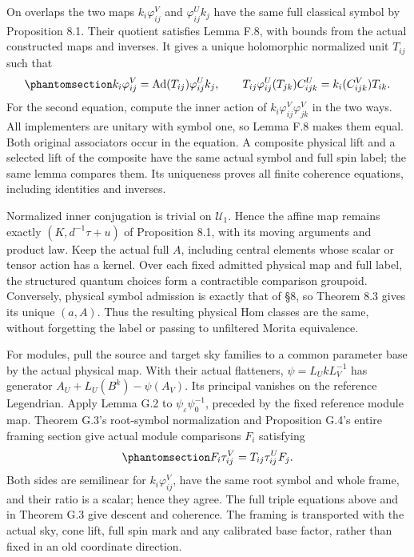 \documentclass[
  english,
  11pt,
  reqno]{amsart}
\begin{document}
On overlaps the two maps \(k_i\varphi^V_{ij}\) and \(\varphi^U_{ij}k_j\)
have the same full classical symbol by Proposition 8.1. Their quotient
satisfies Lemma F.8, with bounds from the actual constructed maps and
inverses. It gives a unique holomorphic normalized unit \(T_{ij}\) such
that
\begin{equation}\protect\phantomsection\label{eq:gg-op-physical-descent}{
 k_i\varphi^V_{ij}
       =\operatorname{Ad}(T_{ij})\varphi^U_{ij}k_j,\qquad
 T_{ij}\varphi^U_{ij}(T_{jk})C^U_{ijk}
       =k_i(C^V_{ijk})T_{ik}.
}\end{equation} For the second equation, compute the inner action of
\(k_i\varphi^V_{ij}\varphi^V_{jk}\) in the two ways. All implementers
are unitary with symbol one, so Lemma F.8 makes them equal. Both
original associators occur in the equation. A composite physical lift
and a selected lift of the composite have the same actual symbol and
full spin label; the same lemma compares them. Its uniqueness proves all
finite coherence equations, including identities and inverses.

Normalized inner conjugation is trivial on \(\mathscr U_1\). Hence the
affine map remains exactly \((K,d^{-1}\tau+u)\) of Proposition 8.1, with
its moving arguments and product law. Keep the actual full \(A\),
including central elements whose scalar or tensor action has a kernel.
Over each fixed admitted physical map and full label, the structured
quantum choices form a contractible comparison groupoid. Conversely,
physical symbol admission is exactly that of §8, so Theorem 8.3 gives
its unique \((a,A)\). Thus the resulting physical Hom classes are the
same, without forgetting the label or passing to unfiltered Morita
equivalence.

For modules, pull the source and target sky families to a common
parameter base by the actual physical map. With their actual flatteners,
\(\psi=L_UkL_V^{-1}\) has generator \(A_U+L_U(B^k)-\psi(A_V)\). Its
principal vanishes on the reference Legendrian. Apply Lemma G.2 to
\(\psi_\varepsilon\psi_0^{-1}\), preceded by the fixed reference module
map. Theorem G.3's root-symbol normalization and Proposition G.4's
entire framing section give actual module comparisons \(F_i\) satisfying
\begin{equation}\protect\phantomsection\label{eq:gg-op-physical-module-descent}{
 F_i\tau^V_{ij}=T_{ij}\tau^U_{ij}F_j .
}\end{equation} Both sides are semilinear for \(k_i\varphi^V_{ij}\),
have the same root symbol and whole frame, and their ratio is a scalar;
hence they agree. The full triple equations above and in Theorem G.3
give descent and coherence. The framing is transported with the actual
sky, cone lift, full spin mark and any calibrated base factor, rather
than fixed in an old coordinate direction.
\end{document}
